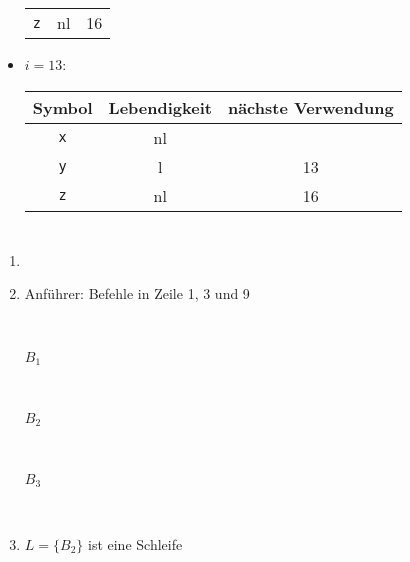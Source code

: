\documentclass[a4paper,10pt]{scrartcl}
\begin{document}
\begin{itemize}
\begin{center}
\begin{tabular}{c|c|c}
 \texttt{z} & nl           & 16                 \\
\end{tabular}
\end{center}
 \item $i = 13$:
\begin{center}
\begin{tabular}{c|c|c}
 Symbol     & Lebendigkeit & nächste Verwendung \\\hline
 \texttt{x} & nl           &                    \\
 \texttt{y} & l            & 13                 \\
 \texttt{z} & nl           & 16                 \\
\end{tabular}
\end{center}
\end{itemize}

\section{}
\begin{enumerate}
\item   \hspace{0em}
\item   Anführer: Befehle in Zeile 1, 3 und 9
		\begin{center}
			\begin{psmatrix}[rowsep=0.5cm]
				[name=Entry]  \\
				[name=B1] { $B_1$\hspace{1em}\begin{minipage}[t]{6cm}%
					\end{minipage}}\\
				[name=B2] { $B_2$\hspace{1em}\begin{minipage}[t]{6cm}%
					\end{minipage}} \\
				[name=B3] { $B_3$\hspace{1em}\begin{minipage}[t]{6cm}%
					\end{minipage}} \\
				[name=Exit] 
			\end{psmatrix}
		\end{center}
\item   $L = \{B_2\}$ ist eine Schleife
\end{enumerate}
\end{document}
